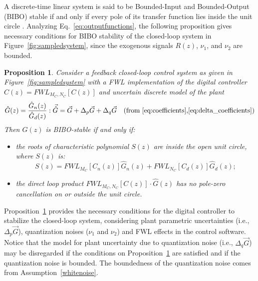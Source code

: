 \documentclass[final]{sig-alternate-05-2015}
\newcommand{\red}[1]{{\color{red}#1}}
\newtheorem{myprop}{Proposition}
\begin{document}

A discrete-time linear system is said to be Bounded-Input and Bounded-Output
(BIBO) stable if and only if every pole of its transfer function lies inside
the unit circle \cite{Astrom08}.  Analyzing Eq.~\eqref{eq:outputfunctions},
the following proposition gives necessary conditions for BIBO stability of
the closed-loop system in Figure~\ref{fig:sampledsystem}, since the
exogenous signals $R(z)$, $\nu_{1}$, and $\nu_{2}$ are bounded.

\begin{myprop}{\cite{fadali,Bessa16}}
\label{prop:eq_int_stab} 
%
Consider a feedback closed-loop control system as given in
Figure~\ref{fig:sampledsystem} with a FWL implementation of the digital
controller $\hat{C}(z) =\mathit{FWL}_{M_C,N_C}[C(z)]$ and uncertain discrete
model of the plant
%
$$\hat{G}(z) =\frac{\hat{G}_n(z)}{\hat{G}_d(z)}: \vec{\hat{G}}=\vec{G}+\Delta_p \vec{G}+\Delta_q
\vec{G} \text{\quad(from~\ref{eq:coefficients},\ref{eq:delta_coefficients})}$$
%
Then $\hat{G}(z)$ is BIBO-stable if and only if:
%
\begin{itemize}
\item  the roots of characteristic polynomial $S(z)$ are inside the open unit circle, where $S(z)$ is:
\begin{equation}
\label{eq:internal_stab_lemma}
S(z)=\mathit{FWL}_{M_C}[C_n(z)]\hat{G}_n(z)+\mathit{FWL}_{N_C}[C_d(z)]\hat{G}_d(z);
\end{equation}
\item the direct loop product $\mathit{FWL}_{M_C,N_C}[C(z)]\cdot \hat{G}(z)$ has no pole-zero cancellation on or outside the unit circle.
\end{itemize}
\end{myprop}

Proposition~\ref{prop:eq_int_stab} provides the necessary conditions for the
digital controller to stabilize the closed-loop system, considering plant
parametric uncertainties (i.e., $\Delta_p \vec{G}$), quantization noises
($\nu_{1}$ and $\nu_{2}$) and FWL effects in the control software.  Notice
that the model for plant uncertainty due to quantization noise (i.e.,
$\Delta_q \vec{G}$) may be disregarded if the conditions on
Proposition~\ref{prop:eq_int_stab} are satisfied and if the quantization
noise is bounded.  The boundedness of the quantization noise comes from
Assumption~\ref{whitenoise}.

\end{document}
